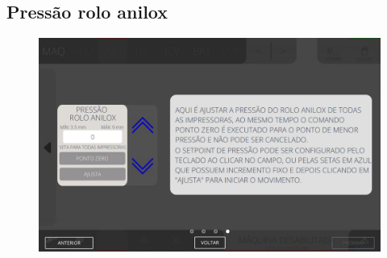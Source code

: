\subsection{Pressão rolo anilox}
\begin{figure}
    \centering
    \includegraphics[width=576 px,height=360 px]{src/imagesICV/04-printters/01-printters/settings/13.png}
\end{figure}